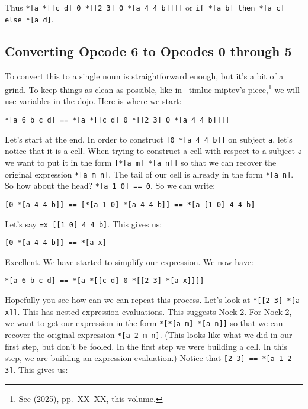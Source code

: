 \documentclass[twoside]{article}
\begin{document}
Thus \lstinline[style=inlinecode]{*[a *[[c d] 0 *[[2 3] 0 *[a 4 4 b]]]]} or \lstinline[style=inlinecode]{if *[a b] then *[a c] else *[a d]}.

\subsection*{Converting Opcode 6 to Opcodes 0 through 5}

To convert this to a single noun is straightforward enough, but it's a bit of a grind. To keep things as clean as possible, like in ~timluc-miptev's piece,\footnote{See  (2025), pp.~XX--XX, this volume.} we will use variables in the dojo. Here is where we start:

\begin{lstlisting}[style=listingcode]
*[a 6 b c d] == *[a *[[c d] 0 *[[2 3] 0 *[a 4 4 b]]]]
\end{lstlisting}

Let's start at the end. In order to construct \lstinline[style=inlinecode]{[0 *[a 4 4 b]]} on subject \lstinline[style=inlinecode]{a}, let's notice that it is a cell. When trying to construct a cell with respect to a subject \lstinline[style=inlinecode]{a} we want to put it in the form \lstinline[style=inlinecode]{[*[a m] *[a n]]} so that we can recover the original expression \lstinline[style=inlinecode]{*[a m n]}. The tail of our cell is already in the form \lstinline[style=inlinecode]{*[a n]}. So how about the head? \lstinline[style=inlinecode]{*[a 1 0] == 0}. So we can write:

\begin{lstlisting}[style=listingblock]
[0 *[a 4 4 b]] == [*[a 1 0] *[a 4 4 b]] == *[a [1 0] 4 4 b]
\end{lstlisting}

Let's say \lstinline[style=inlinecode]{=x [[1 0] 4 4 b]}. This gives us:

\begin{lstlisting}[style=listingblock]
[0 *[a 4 4 b]] == *[a x]
\end{lstlisting}

Excellent. We have started to simplify our expression. We now have:

\begin{lstlisting}[style=listingblock]
*[a 6 b c d] == *[a *[[c d] 0 *[[2 3] *[a x]]]]
\end{lstlisting}

Hopefully you see how can we can repeat this process. Let's look at \lstinline[style=inlinecode]{*[[2 3] *[a x]]}. This has nested expression evaluations. This suggests Nock 2. For Nock 2, we want to get our expression in the form \lstinline[style=inlinecode]{*[*[a m] *[a n]]} so that we can recover the original expression \lstinline[style=inlinecode]{*[a 2 m n]}. (This looks like what we did in our first step, but don't be fooled. In the first step we were building a cell. In this step, we are building an expression evaluation.) Notice that \lstinline[style=inlinecode]{[2 3] == *[a 1 2 3]}. This gives us:
\end{document}
